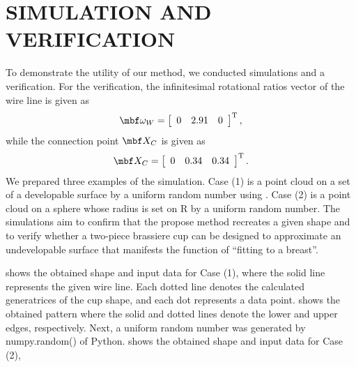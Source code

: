 \documentclass[E]{scitrans}
\begin{document}
\section*{SIMULATION AND VERIFICATION}
To demonstrate the utility of our method, we conducted simulations and a verification. For the verification, the infinitesimal rotational ratios vector   of the wire line is given as
\begin{equation}\label{eq:vrf_omgW}
\mbold{\omega}_W = \left[ \begin{array}{ccc}
0 & 2.91 & 0
\end{array}\right]^\mathrm{T}, 
\end{equation}
while the connection point $ \mbold{X}_C $ is given as 
\begin{equation}\label{eq:givenXc}
\mbold{X}_C = \left[ \begin{array}{ccc}
0 & 0.34 & 0.34
\end{array}\right]^\mathrm{T}.
\end{equation}
We prepared three examples of the simulation. Case (1) is a point cloud on a set of a developable surface by a uniform random number using . Case (2) is a point cloud on a sphere whose radius is set on R by a uniform random number. 
The simulations aim to confirm that the propose method recreates a given shape and to verify whether a two-piece brassiere cup can be designed to approximate an undevelopable surface that manifests the function of “fitting to a breast”.  

 shows the obtained shape and input data for Case (1), where the solid line represents the given wire line. Each dotted line denotes the calculated generatrices of the cup shape, and each dot represents a data point.   shows the obtained pattern where the solid and dotted lines denote the lower and upper edges, respectively. 
Next, a uniform random number was generated by numpy.random() of Python.  shows the obtained shape and input data for Case (2), 

\end{document}
